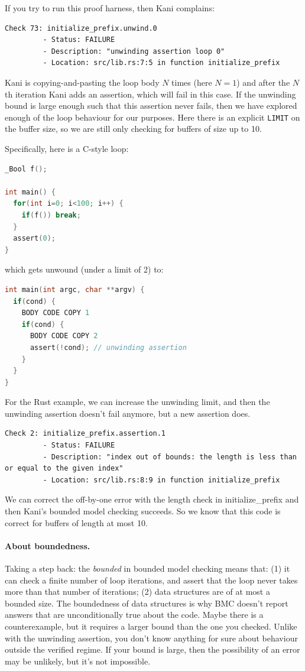 \documentclass[11pt]{article}
\begin{document}
If you try to run this proof harness, then Kani complains:
{\scriptsize
\begin{verbatim}
Check 73: initialize_prefix.unwind.0
         - Status: FAILURE
         - Description: "unwinding assertion loop 0"
         - Location: src/lib.rs:7:5 in function initialize_prefix
\end{verbatim}
}

Kani is copying-and-pasting the loop body $N$ times (here $N=1$) and
after the $N$th iteration Kani adds an assertion, which will fail in this case. If the unwinding bound
is large enough such that this assertion never fails, then we have explored
enough of the loop behaviour for our purposes. Here there is an explicit
\texttt{LIMIT} on the buffer size, so we are still only checking for buffers of
size up to 10.

Specifically, here is a C-style loop:
\begin{lstlisting}[language=C]
_Bool f();

int main() {
  for(int i=0; i<100; i++) {
    if(f()) break;
  }
  assert(0);
}
\end{lstlisting}
which gets unwound (under a limit of 2) to:
\begin{lstlisting}[language=C]
int main(int argc, char **argv) {
  if(cond) {
    BODY CODE COPY 1
    if(cond) {
      BODY CODE COPY 2
      assert(!cond); // unwinding assertion
    }
  }
}
\end{lstlisting}

For the Rust example, we can increase the unwinding limit, and then the unwinding assertion doesn't fail anymore,
but a new assertion does.
{\scriptsize
\begin{verbatim}
Check 2: initialize_prefix.assertion.1
         - Status: FAILURE
         - Description: "index out of bounds: the length is less than or equal to the given index"
         - Location: src/lib.rs:8:9 in function initialize_prefix
\end{verbatim}
}
We can correct the off-by-one error with the length check in \textsf{initialize\_prefix} and
then Kani's bounded model checking succeeds. So we know that this code is correct for buffers of
length at most 10.

\paragraph{About boundedness.} Taking a step back: the \emph{bounded} in bounded model checking means that: (1) it can check
a finite number of loop iterations, and assert that the loop never takes more than that number of iterations;
(2) data structures are of at most a bounded size. The boundedness of data structures is why BMC doesn't
report answers that are unconditionally true about the code. Maybe there is a counterexample, but it requires
a larger bound than the one you checked. Unlike with the unwinding assertion, you don't know anything
for sure about behaviour outside the verified regime. If your bound is large, then the possibility of
an error may be unlikely, but it's not impossible.
\end{document}
